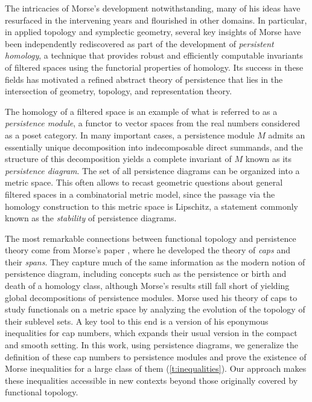 The intricacies of Morse's development notwithstanding, many of his ideas have resurfaced in the intervening years and flourished in other domains.
In particular, in applied topology and symplectic geometry, several key insights of Morse have been independently rediscovered as part of the development of \emph{persistent homology}, a technique that provides robust and efficiently computable invariants of filtered spaces using the functorial properties of homology.
Its success in these fields has motivated a refined abstract theory of persistence that lies in the intersection of geometry, topology, and representation theory.

The homology of a filtered space is an example of what is referred to as a \emph{persistence module}, a functor to vector spaces from the real numbers considered as a poset category.
In many important cases, a persistence module $M$ admits an essentially unique decomposition into indecomposable direct summands, and the structure of this decomposition yields a complete invariant of $M$ known as its \emph{persistence diagram}.
The set of all persistence diagrams can be organized into a metric space.
This often allows to recast geometric questions about general filtered spaces in a combinatorial metric model, since the passage via the homology construction to this metric space is Lipschitz, a statement commonly known as the \emph{stability} of persistence diagrams.

The most remarkable connections between functional topology and persistence theory come from Morse's paper \cite{Morse.1940}, where he developed the theory of \emph{caps} and their \emph{spans}.
They capture much of the same information as the modern notion of persistence diagram, including concepts such as the persistence or birth and death of a homology class, although Morse's results still fall short of yielding global decompositions of persistence modules.
Morse used his theory of caps to study functionals on a metric space by analyzing the evolution of the topology of their sublevel sets.
A key tool to this end is a version of his eponymous inequalities for cap numbers, which expands their usual version in the compact and smooth setting.
In this work, using persistence diagrams, we generalize the definition of these cap numbers to persistence modules and prove the existence of Morse inequalities for a large class of them (\cref{t:inequalities}).
Our approach makes these inequalities accessible in new contexts beyond those originally covered by functional topology. %

